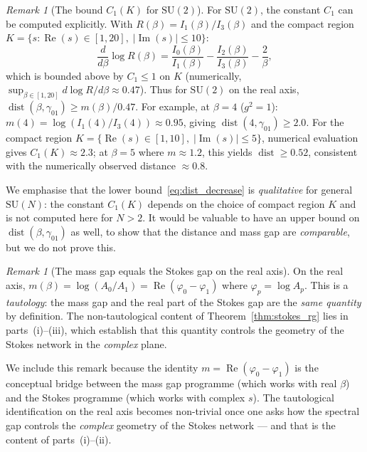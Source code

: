 \documentclass[12pt]{article}
\theoremstyle{definition}
\theoremstyle{remark}
\newtheorem{remark}[theorem]{Remark}
\newcommand{\SU}{\mathrm{SU}}
\newcommand{\re}{\operatorname{Re}}
\newcommand{\im}{\operatorname{Im}}
\newcommand{\dist}{\operatorname{dist}}
\begin{document}
\begin{remark}[The bound $C_1(K)$ for $\SU(2)$]
\label{rem:c1_su2}
For $\SU(2)$, the constant $C_1$ can be computed explicitly.
With $R(\beta) = I_1(\beta)/I_3(\beta)$ and the compact region
$K = \{s : \re(s) \in [1, 20],\; |\im(s)| \le 10\}$:
\[
\frac{d}{d\beta}\log R(\beta) =
\frac{I_0(\beta)}{I_1(\beta)} - \frac{I_2(\beta)}{I_3(\beta)}
- \frac{2}{\beta},
\]
which is bounded above by $C_1 \le 1$ on $K$ (numerically,
$\sup_{\beta \in [1,20]} d\log R/d\beta \approx 0.47$).
Thus for $\SU(2)$ on the real axis, $\dist(\beta, \gamma_{01})
\ge m(\beta)/0.47$.  For example, at $\beta = 4$ ($g^2 = 1$):
$m(4) = \log(I_1(4)/I_3(4)) \approx 0.95$, giving
$\dist(4, \gamma_{01}) \ge 2.0$.
For the compact region $K = \{\re(s) \in [1,10],\;
|\im(s)| \le 5\}$, numerical evaluation gives
$C_1(K) \approx 2.3$; at $\beta = 5$ where
$m \approx 1.2$, this yields $\dist \ge 0.52$, consistent
with the numerically observed distance $\approx 0.8$.

We emphasise that the lower bound~\eqref{eq:dist_decrease} is
\emph{qualitative} for general $\SU(N)$: the constant $C_1(K)$
depends on the choice of compact region $K$ and is not computed
here for $N > 2$.  It would be valuable to have an upper bound on
$\dist(\beta, \gamma_{01})$ as well, to show that the distance and
mass gap are \emph{comparable}, but we do not prove this.
\end{remark}

\begin{remark}[The mass gap equals the Stokes gap on the real axis]
\label{rem:tautology}
On the real axis, $m(\beta) = \log(A_0/A_1)
= \re(\varphi_0 - \varphi_1)$ where $\varphi_p = \log A_p$.
This is a \emph{tautology}: the mass gap and the real part of the
Stokes gap are the \emph{same quantity} by definition.  The
non-tautological content of Theorem~\ref{thm:stokes_rg} lies in
parts~(i)--(iii), which establish that this quantity controls the
geometry of the Stokes network in the \emph{complex} plane.

We include this remark because the identity $m = \re(\varphi_0 -
\varphi_1)$ is the conceptual bridge between the mass gap programme
(which works with real $\beta$) and the Stokes programme (which
works with complex $s$).  The tautological identification on the
real axis becomes non-trivial once one asks how the spectral gap
controls the \emph{complex} geometry of the Stokes network --- and
that is the content of parts~(i)--(ii).
\end{remark}
\end{document}
